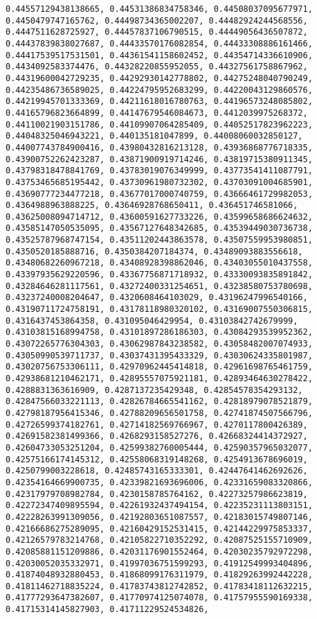 \documentclass[11pt]{article}
\begin{document}
\begin{Verbatim}[commandchars=\\\{\}]
0.44557129438138665, 0.44531386834758346, 0.44508037095677971, 0.4450479747165762, 0.44498734365002207, 0.44482924244568556, 0.4447511628725927, 0.44457837106790515, 0.44449056436507872, 0.44437839838027687, 0.44433570176082854, 0.44433308886161466, 0.44417539517531501, 0.44361541158602452, 0.44354714336610906, 0.4434092583374476, 0.44328220855952055, 0.44327561758867962, 0.44319600042729235, 0.44292930142778802, 0.44275248040790249, 0.44235486736589025, 0.44224795952683299, 0.44220043129860576, 0.44219945701333369, 0.44211618016780763, 0.44196573248085802, 0.44165796823664899, 0.44147679546084673, 0.4412039975268372, 0.44110021903151786, 0.44109907064285409, 0.44052517823962223, 0.44048325046943221, 0.440135181047899, 0.44008060032850127, 0.44007743784900416, 0.43980432816213128, 0.43936868776718335, 0.43900752262423287, 0.43871900919714246, 0.43819715380911345, 0.43798318478841769, 0.43783019076349999, 0.43773541411087791, 0.43753465685195442, 0.43730961980732302, 0.43703091004685901, 0.43690777234477218, 0.43677017000740759, 0.43666461729982053, 0.4364988963888225, 0.43646928768650411, 0.436451746581066, 0.43625008094714712, 0.43600591627733226, 0.43599658686624632, 0.43585147050535095, 0.43567127648342685, 0.43539449030736738, 0.43525787968747154, 0.43511202443863578, 0.43507559953980851, 0.4350520185888716, 0.4350384207184374, 0.43489093883556618, 0.43480682260967218, 0.43408928398862046, 0.43403055010437558, 0.43397935629220596, 0.43367756871718932, 0.43330093835891842, 0.43284646281117561, 0.43272400331254651, 0.43238580753780698, 0.43237240008204647, 0.4320608464103029, 0.43196247996540166, 0.43190711724758191, 0.43178118980320102, 0.43169007550306815, 0.4316437453864358, 0.431095046429954, 0.43103842742679999, 0.43103815168994758, 0.43101897286186303, 0.43084293539952362, 0.43072265776304303, 0.43062987843238582, 0.43058482007074933, 0.43050990539711737, 0.43037431395433329, 0.43030624335801987, 0.43020756753306111, 0.42970962445414818, 0.42961698765461759, 0.42938681210462171, 0.42895557075921181, 0.42893464630278422, 0.4288831363616909, 0.4287137235429348, 0.42854578354293132, 0.42847566033221113, 0.42826784665541162, 0.42818979078521879, 0.42798187956415346, 0.42788209656501758, 0.42741874507566796, 0.42726599374182761, 0.42714182569766967, 0.4270117800426389, 0.42691582381499366, 0.4268293158527276, 0.42668324414372927, 0.42604733053251204, 0.42599382760005444, 0.42590357965032077, 0.42575166174145312, 0.42558068319148268, 0.4254913678696019, 0.4250799003228618, 0.42485743165333301, 0.42447641462692626, 0.42354164669900735, 0.42339821693696006, 0.42331659083320866, 0.42317979708982784, 0.4230158785764162, 0.42273257986623819, 0.42272347409895594, 0.42261932437494154, 0.42235231113803151, 0.42228263991309056, 0.42192803651087557, 0.42183015749807146, 0.42166686275289095, 0.42160429152531415, 0.42144229975853337, 0.42126579783214768, 0.42105822710352292, 0.42087525155710909, 0.42085881151209886, 0.42031176901552464, 0.42030235792972298, 0.42030052035332971, 0.41997036751599293, 0.41912549993404896, 0.41874048932880453, 0.41868099176311979, 0.41829263992442228, 0.41811462718835224, 0.41783743812742852, 0.41783418112632215, 0.41777293647382607, 0.41770974125074078, 0.41757955590169338, 0.41715314145827903, 0.41711229524534826, 
\end{Verbatim}
\end{document}
